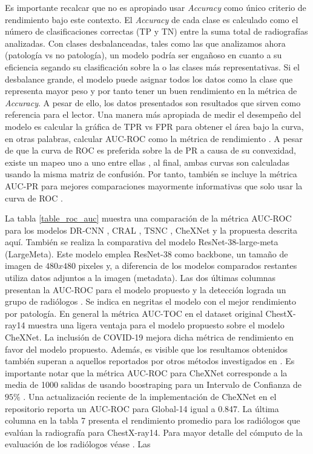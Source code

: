 {Es importante recalcar que no es apropiado usar \textit{Accuracy} como único criterio de rendimiento
bajo este contexto. El \textit{Accuracy} de cada clase es calculado como el número de clasificaciones
correctas (TP y TN) entre la suma total de radiografías analizadas. Con clases desbalanceadas,
tales como las que analizamos ahora (patología vs no patología), un modelo podría ser engañoso en cuanto
a su eficiencia segando su clasificación sobre la o las clases más representativas. Si el desbalance
grande, el modelo puede asignar todos los datos como la clase que representa mayor peso y por tanto
tener un buen rendimiento en la métrica de \textit{Accuracy}. A pesar de ello, los datos presentados
son resultados que sirven como referencia para el lector. Una manera más apropiada de medir el desempeño
del modelo es calcular la gráfica de TPR vs FPR para obtener el área bajo la curva, en otras palabras,
calcular AUC-ROC como la métrica de rendimiento \cite{Hanley1983-tu}. A pesar de que la curva de ROC
es preferida sobre la de PR a causa de su convexidad, existe un mapeo uno a uno entre ellas
\cite{10.1145/1143844.1143874}, al final, ambas curvas son calculadas usando la misma matriz de confusión. Por tanto, también se
incluye la métrica AUC-PR para mejores comparaciones mayormente informativas que solo usar la
curva de ROC \cite{Saito2015-db}.

La tabla \ref{table_roc_auc} muestra una comparación de la métrica AUC-ROC para los modelos DR-CNN
\cite{DBLP:journals/corr/abs-1808-05744}, CRAL \cite{GUAN2020259}, TSNC \cite{CHEN2020221}, CheXNet
\cite{rajpurkar2018deep} y la propuesta descrita aquí. También se realiza la comparativa del modelo
ResNet-38-large-meta (LargeMeta). Este modelo emplea ResNet-38 como backbone, un tamaño de imagen de
$480 x 480$ pixeles y, a diferencia de los modelos comparados restantes utiliza datos adjuntos a la
imagen (metadata). Las dos últimas columnas presentan la AUC-ROC para el modelo propuesto y la
detección lograda un grupo de radiólogos \cite{rajpurkar2018deep}. Se indica en negritas el modelo con el mejor
rendimiento por patología. En general la métrica AUC-TOC en el dataset original ChestX-ray14 muestra
una ligera ventaja para el modelo propuesto sobre el modelo CheXNet. La inclusión de COVID-19
mejora dicha métrica de rendimiento en favor del modelo propuesto. Además, es visible que
los resultamos obtenidos también superan a aquellos reportados por otros métodos investigados en
\cite{baltruschat2019comparison}. Es importante notar que la métrica AUC-ROC para CheXNet corresponde
a la media de 1000 salidas de usando boostraping para un Intervalo de Confianza de $95\%$
\cite{rajpurkar2018deep}. Una actualización reciente de la implementación de CheXNet en el repositorio
\cite{chexnet_code} reporta un AUC-ROC para Global-14 igual a 0.847. La última columna en la tabla 7 presenta
el rendimiento promedio para los radiólogos que evalúan la radiografía para ChestX-ray14. Para
mayor detalle del cómputo de la evaluación de los radiólogos véase \cite{rajpurkar2018deep}. Las }
